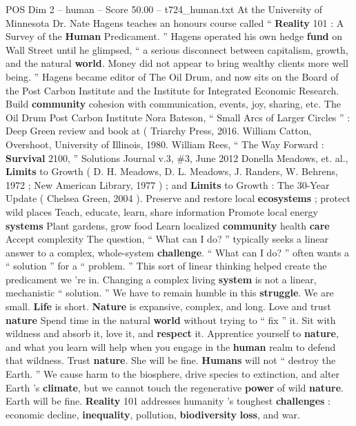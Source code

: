 \begin{textsample}{POS Dim 2 – human – Score 50.00 – t724\_human.txt}  \label{ex:f2_pos_029}
At the University of Minnesota Dr.
Nate Hagens teaches an honours course called “ \textbf{Reality} 101 : A Survey of the \textbf{Human} Predicament. ” Hagens operated his own hedge \textbf{fund} on Wall Street until he glimpsed, “ a serious disconnect between capitalism, growth, and the natural \textbf{world}.
Money did not appear to bring wealthy clients more well being. ” Hagens became editor of The Oil Drum, and now sits on the Board of the Post Carbon Institute and the Institute for Integrated Economic Research.
Build \textbf{community} cohesion with communication, events, joy, sharing, etc.
The Oil Drum Post Carbon Institute Nora Bateson, “ Small Arcs of Larger Circles ” : Deep Green review and book at ( Triarchy Press, 2016.
William Catton, Overshoot, University of Illinois, 1980.
William Rees, “ The Way Forward : \textbf{Survival} 2100, ” Solutions Journal v.3, \#3, June 2012 Donella Meadows, et. al., \textbf{Limits} to Growth ( D.
H.
Meadows, D.
L.
Meadows, J.
Randers, W.
Behrens, 1972 ; New American Library, 1977 ) ; and \textbf{Limits} to Growth : The 30-Year Update ( Chelsea Green, 2004 ).
Preserve and restore local \textbf{ecosystems} ; protect wild places Teach, educate, learn, share information Promote local energy \textbf{systems} Plant gardens, grow food Learn localized \textbf{community} health \textbf{care} Accept complexity The question, “ What can I do? ” typically seeks a linear answer to a complex, whole-system \textbf{challenge}. “ What can I do? ” often wants a “ solution ” for a “ problem. ” This sort of linear thinking helped create the predicament we ’re in.
Changing a complex living \textbf{system} is not a linear, mechanistic “ solution. ” We have to remain humble in this \textbf{struggle}.
We are small. \textbf{Life} is short. \textbf{Nature} is expansive, complex, and long.
Love and trust \textbf{nature} Spend time in the natural \textbf{world} without trying to “ fix ” it.
Sit with wildness and absorb it, love it, and \textbf{respect} it.
Apprentice yourself to \textbf{nature}, and what you learn will help when you engage in the \textbf{human} realm to defend that wildness.
Trust \textbf{nature}.
She will be fine. \textbf{Humans} will not “ destroy the Earth. ” We cause harm to the biosphere, drive species to extinction, and alter Earth ’s \textbf{climate}, but we cannot touch the regenerative \textbf{power} of wild \textbf{nature}.
Earth will be fine. \textbf{Reality} 101 addresses humanity ’s toughest \textbf{challenges} : economic decline, \textbf{inequality}, pollution, \textbf{biodiversity} \textbf{loss}, and war.

\end{textsample}
